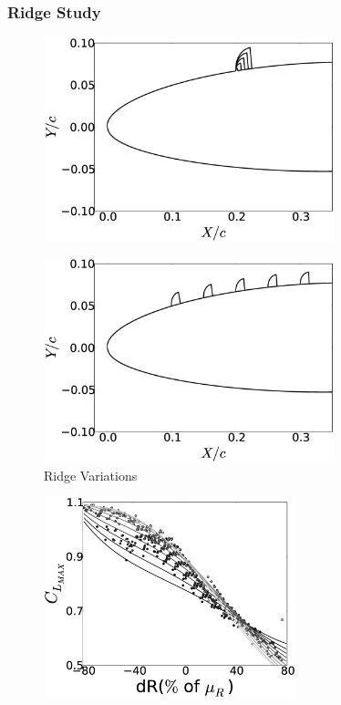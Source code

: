 \documentclass[9pt]{beamer}
\begin{document}
\begin{frame}
\frametitle{Ridge Study}
\label{sec-2-7}

\centering
\vspace{-0.5cm}
\begin{minipage}[t]{0.45\linewidth}
\begin{figure}[t]
\includegraphics[width=0.75\textwidth]{RidgeRVariation}
\end{figure}
\vspace{-0.5cm}
\begin{figure}[t]
\includegraphics[width=0.75\textwidth]{RidgeSVariation}
\caption{Ridge Variations}
\end{figure}
\vspace{-0.5cm}
\end{minipage}
\begin{minipage}[t]{0.45\linewidth}
\begin{figure}[t]
\includegraphics[width=0.65\textwidth]{MC_surrogate_LargeUnc_CL}

\end{figure}
\end{minipage}
\end{frame}
\end{document}
